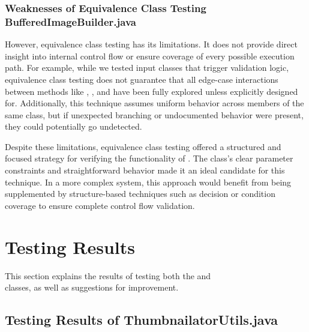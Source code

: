 \documentclass[12pt]{article}
\begin{document}
    \markboth{}{}
    \subsubsection{Weaknesses of Equivalence Class Testing BufferedImageBuilder.java}
    \markboth{}{}

    However, equivalence class testing has its limitations.
    It does not provide direct insight into internal control flow or ensure
        coverage of every possible execution path.
    For example, while we tested input classes that trigger validation logic,
        equivalence class testing does not guarantee that all edge-case
        interactions between methods like , , and
         have been fully explored unless explicitly designed
        for.
    Additionally, this technique assumes uniform behavior across members of the
        same class, but if unexpected branching or undocumented behavior were
        present, they could potentially go undetected.

    Despite these limitations, equivalence class testing offered a structured
        and focused strategy for verifying the functionality of
        .
    The class's clear parameter constraints and straightforward behavior made it
        an ideal candidate for this technique.
    In a more complex system, this approach would benefit from being
        supplemented by structure-based techniques such as decision or condition
        coverage to ensure complete control flow validation.

    \markboth{}{}
    \section{Testing Results}
    \markboth{}{}

    This section explains the results of testing both the
         and\\
        classes, as well as suggestions for improvement.

    \markboth{}{}
    \subsection{Testing Results of ThumbnailatorUtils.java}
    \markboth{}{}
\end{document}
